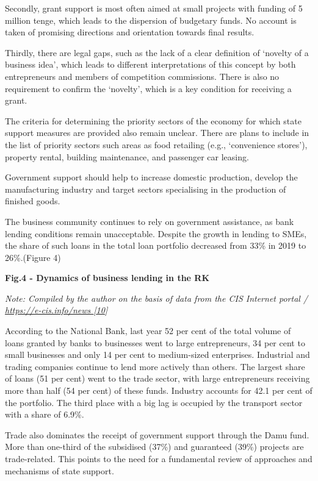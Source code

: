 Secondly, grant support is most often aimed at small projects with
funding of 5 million tenge, which leads to the dispersion of budgetary
funds. No account is taken of promising directions and orientation
towards final results.

Thirdly, there are legal gaps, such as the lack of a clear definition of
`novelty of a business idea', which leads to different interpretations
of this concept by both entrepreneurs and members of competition
commissions. There is also no requirement to confirm the `novelty',
which is a key condition for receiving a grant.

The criteria for determining the priority sectors of the economy for
which state support measures are provided also remain unclear. There are
plans to include in the list of priority sectors such areas as food
retailing (e.g., `convenience stores'), property rental, building
maintenance, and passenger car leasing.

Government support should help to increase domestic production, develop
the manufacturing industry and target sectors specialising in the
production of finished goods.

The business community continues to rely on government assistance, as
bank lending conditions remain unacceptable. Despite the growth in
lending to SMEs, the share of such loans in the total loan portfolio
decreased from 33\% in 2019 to 26\%.(Figure 4)

{\bfseries Fig.4 - Dynamics of business lending in the RK}

\emph{Note: Compiled by the author on the basis of data from the CIS
Internet portal /
\href{https://e-cis.info/news\%20\%5b10}{https://e-cis.info/news
{[}10}{]}}

According to the National Bank, last year 52 per cent of the total
volume of loans granted by banks to businesses went to large
entrepreneurs, 34 per cent to small businesses and only 14 per cent to
medium-sized enterprises. Industrial and trading companies continue to
lend more actively than others. The largest share of loans (51 per cent)
went to the trade sector, with large entrepreneurs receiving more than
half (54 per cent) of these funds. Industry accounts for 42.1 per cent
of the portfolio. The third place with a big lag is occupied by the
transport sector with a share of 6.9\%.

Trade also dominates the receipt of government support through the Damu
fund. More than one-third of the subsidised (37\%) and guaranteed (39\%)
projects are trade-related. This points to the need for a fundamental
review of approaches and mechanisms of state support.

